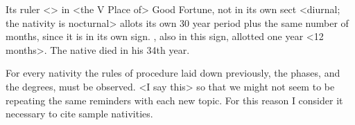 Its ruler <\Saturn> in <the V Place of> Good Fortune, not in its own sect <diurnal; the nativity is nocturnal>
allots its own 30 year period plus the same number of months, since it is in its own sign. \Jupiter, also in this sign, allotted one year <12 months>. The native died in his 34th year.

For every nativity the rules of procedure laid down previously, the phases, and the degrees, must be observed. <I say this> so that we might not seem to be repeating the same reminders with each new topic. For this reason I consider it necessary to cite sample nativities.


\newpage